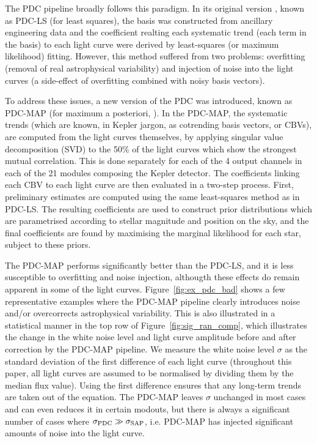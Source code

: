 \documentclass[useAMS,usenatbib]{mn2e}
\begin{document}
The PDC pipeline broadly follows this paradigm. In its original
version \citep{twi+10a,twi+10b}, known as PDC-LS (for least squares),
the basis was constructed from ancillary engineering data and the
coefficient realting each systematic trend (each term in the basis) to
each light curve were derived by least-squares (or maximum likelihood)
fitting. However, this method suffered from two problems: overfitting
(removal of real astrophysical variability) and injection of noise
into the light curves (a side-effect of overfitting combined with
noisy basis vectors). 

To address these issues, a new version of the PDC was introduced,
known as PDC-MAP (for maximum a posteriori, \citealt{smi+12}). In the
PDC-MAP, the systematic trends (which are known, in Kepler jargon, as
cotrending basis vectors, or CBVs), are computed from the light curves
themselves, by applying singular value decomposition (SVD) to the 50\%
of the light curves which show the strongest mutual correlation. This
is done separately for each of the 4 output channels in each of the 21
modules composing the Kepler detector. The
coefficients linking each CBV to each light curve are then evaluated
in a two-step process. First, preliminary estimates are computed using
the same least-squares method as in PDC-LS. The resulting coefficients
are used to construct prior distributions which are parametrised
according to stellar magnitude and position on the sky, and the final
coefficients are found by maximising the marginal likelihood for each
star, subject to these priors.

The PDC-MAP performs significantly better than the PDC-LS, and it is
less susceptible to overfitting and noise injection, althougth these
effects do remain apparent in some of the light
curves. Figure~\ref{fig:ex_pdc_bad} shows a few representative
examples where the PDC-MAP pipeline clearly introduces noise and/or
overcorrects astrophysical variability.  This is also illustrated in a
statistical manner in the top row of Figure~\ref{fig:sig_ran_comp},
which illustrates the change in the white noise level and light curve
amplitude before and after correction by the PDC-MAP pipeline. We
measure the white noise level $\sigma$ as the standard deviation of
the first difference of each light curve (throughout this paper, all
light curves are assumed to be normalised by dividing them by the
median flux value). Using the first difference ensures that any
long-term trends are taken out of the equation. The PDC-MAP leaves
$\sigma$ unchanged in most cases and can even reduces it in certain
modouts, but there is always a significant number of cases where
$\sigma_{\rm PDC} \gg \sigma_{\rm SAP}$, i.e. PDC-MAP has injected
significant amounts of noise into the light curve. 
\end{document}
